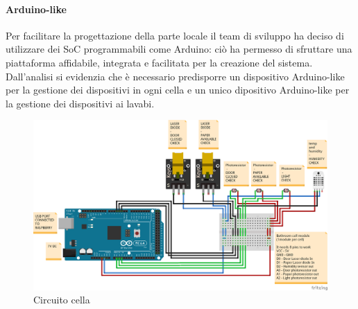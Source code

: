\documentclass[12pt]{article}
\begin{document}
\paragraph{Arduino-like}
Per facilitare la progettazione della parte locale il team di sviluppo ha deciso di utilizzare dei SoC programmabili come Arduino: ciò ha permesso di sfruttare una piattaforma affidabile, integrata e facilitata per la creazione del sistema.
Dall'analisi si evidenzia che è necessario predisporre un dispositivo Arduino-like per la gestione dei dispositivi in ogni cella e un unico dipositivo Arduino-like per la gestione dei dispositivi ai lavabi.\\
 \begin{figure}[H]
\centering
	\includegraphics[scale=0.40]{img/RestroomCell_bb.png}  
    \caption{Circuito cella}
\end{figure}
\end{document}
